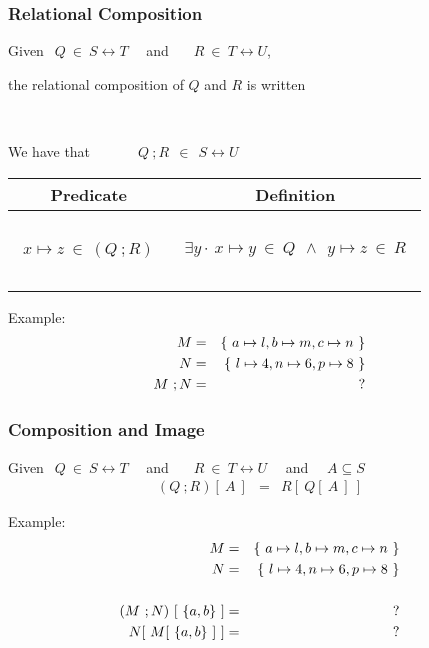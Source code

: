\documentclass{beamer}
\begin{document}
\begin{frame}

\frametitle{Relational Composition}

Given $~~Q ~\in~ S\rel T $   ~~and~~ $~~R ~\in~ T\rel U $, 

the \alert{relational composition} of $Q$ and $R$   is written~ 

~

We have that 
$~~~~~~~~~~~~~~Q~;R ~~\in~~ S\rel U$

\begin{center}
\begin{tabular}{|c|c|}
\hline
Predicate & Definition \\[2pt] \hline
~&\\
$~~x\mapsto z ~\in~ (Q~;R) ~~$ &  $~~\exists y\cdot ~ x\mapsto y ~\in~ Q ~~\land~~ y\mapsto z ~\in~ R~~$  \\
~&\\ \hline\end{tabular}
\end{center}



Example:
\begin{eqnarray*}
    M & = &  \{~ a \mapsto l, b \mapsto m, c \mapsto n ~\} \\
    N & = & \{~ l \mapsto 4, n \mapsto 6, p \mapsto 8 ~\}\\
    M~;N &=&  ?
\end{eqnarray*}




\end{frame}






\begin{frame}

\frametitle{Composition and Image}

Given $~~Q ~\in~ S\rel T $   ~~and~~ $~~R ~\in~ T\rel U $  ~~and~~
$A \subseteq S$
\begin{eqnarray*}
    (Q~;R)[~A~]  &=&  R[~Q[~A~]~]
\end{eqnarray*}



Example:
%
\begin{eqnarray*}
    M & = &  \{~ a \mapsto l, b \mapsto m, c \mapsto n ~\} \\
    N & = & \{~ l \mapsto 4, n \mapsto 6, p \mapsto 8 ~\}\\&\\
    (M~;N)~ [~\{a,b\}~] &=&  ? \\
    N[~M [~\{a,b\}~]~] &=&  ?
\end{eqnarray*}




\end{frame}
\end{document}
